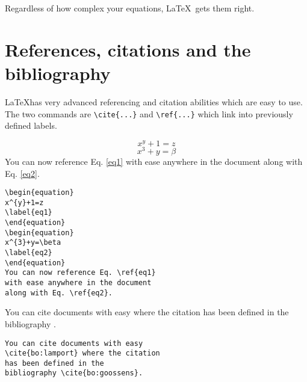 \documentclass[12pt, a4paper]{book}
\begin{document}
Regardless of how complex your equations, \LaTeX\ gets them right.




\section*{References, citations and the bibliography}
\LaTeX has very advanced referencing and citation abilities which are easy to use.  The two commands are \verb+\cite{...}+ and \verb+\ref{...}+ which link into previously defined labels.
\begin{center}
\begin{minipage}[t]{7cm}
\begin{equation}
x^{y}+1=z
\label{eq1}
\end{equation}
\begin{equation}
x^{3}+y=\beta
\label{eq2}
\end{equation}
You can now reference Eq. \ref{eq1} with ease anywhere in the document along with Eq. \ref{eq2}.
\end{minipage}
\hspace{0.5cm}
\begin{minipage}[t]{7cm}
\begin{verbatim}
\begin{equation}
x^{y}+1=z
\label{eq1}
\end{equation}
\begin{equation}
x^{3}+y=\beta
\label{eq2}
\end{equation}
You can now reference Eq. \ref{eq1}
with ease anywhere in the document
along with Eq. \ref{eq2}.
\end{verbatim}
\end{minipage}
\end{center}

\begin{center}
\begin{minipage}[t]{7cm}
You can cite documents with easy \cite{bo:lamport} where the citation has been defined in the bibliography \cite{bo:goossens}.
\end{minipage}
\hspace{0.5cm}
\begin{minipage}[t]{7cm}
\begin{verbatim}
You can cite documents with easy
\cite{bo:lamport} where the citation
has been defined in the
bibliography \cite{bo:goossens}.
\end{verbatim}
\end{minipage}
\end{center}
\end{document}
